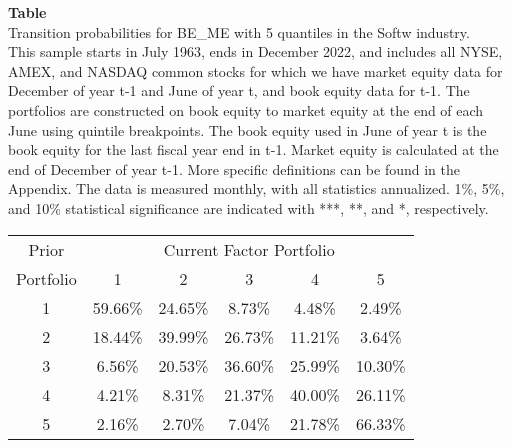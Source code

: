 \begin{table*}[ht!]
\raggedright
{}
\label{tab: transition_probs_BE_ME_Softw_with_5_quantiles}
\textbf{Table \thetable} \\
Transition probabilities for BE_ME with 5 quantiles in the Softw industry. \\
\hspace*{1em}This sample starts in July 1963, ends in December 2022, and includes all NYSE, AMEX, and NASDAQ common stocks for which we have market equity data for December of year t-1 and June of year t, and book equity data for t-1. The portfolios are constructed on book equity to market equity at the end of each June using quintile breakpoints.  The book equity used in June of year t is the book equity for the last fiscal year end in t-1.  Market equity is calculated at the end of December of year t-1.  More specific definitions can be found in the Appendix.  The data is measured monthly, with all statistics annualized.  1\%, 5\%, and 10\% statistical significance are indicated with ***, **, and *, respectively. \\
\vspace{0.5em}
\centering
\begin{adjustbox}{max width=\textwidth}
\begin{tabular}{@{}cccccc@{}}
\toprule
Prior & \multicolumn{5}{c}{Current Factor Portfolio} \\
Portfolio & 1 & 2 & 3 & 4 & 5 \\
\midrule
1 & 59.66\% & 24.65\% & 8.73\% & 4.48\% & 2.49\% \\
2 & 18.44\% & 39.99\% & 26.73\% & 11.21\% & 3.64\% \\
3 & 6.56\% & 20.53\% & 36.60\% & 25.99\% & 10.30\% \\
4 & 4.21\% & 8.31\% & 21.37\% & 40.00\% & 26.11\% \\
5 & 2.16\% & 2.70\% & 7.04\% & 21.78\% & 66.33\% \\
\bottomrule
\end{tabular}
\end{adjustbox}
\end{table*}